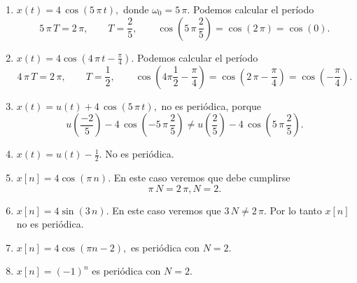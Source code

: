 \begin{enumerate}
\item  $x\left( t\right) = 4 \, \cos \left( 5 \, \pi \, t\right),$ donde $\omega_{0} = 5 \, \pi$.
Podemos calcular el período
\begin{equation}
    5 \, \pi \, T= 2 \, \pi , \qquad T=\frac{2}{5}, \qquad \cos \left( 5 \, \pi \, \frac{2}{5}\right) = 
    \cos \left( 2 \, \pi \right) = \cos \left( 0\right) .
\end{equation}

\item  $x\left( t\right) =4\cos \left( 4 \, \pi \, t-\frac{\pi }{4}\right).$ Podemos calcular el período
\begin{equation}
    4 \, \pi \, T= 2 \, \pi , \qquad T=\frac{1}{2}, \qquad \cos \left( 4\pi \frac{1}{2} - \frac{\pi}{4}\right) = 
    \cos \left( 2 \, \pi - \frac{\pi}{4}\right) = \cos \left( -\frac{\pi}{4}\right) .
\end{equation}

\item  $x\left( t\right) =u\left( t\right) +4 \, \cos \left( 5 \, \pi \, t\right),$ 
no es periódica, porque 
\begin{equation}
u\left(\frac{-2}{5}\right) - 4 \, \cos \left(-5 \, \pi \, \frac{2}{5}\right) \neq u\left(\frac{2}{5}\right) - 4 \, \cos \left(5 \, \pi \, \frac{2}{5}\right). 
\end{equation}


\item  $x\left( t\right) =u\left( t\right) -\frac{1}{2}.$ No es periódica.

\item  $x\left[ n\right] =4\cos \left( \pi \, n\right).$ En este caso veremos que debe cumplirse 
\begin{equation}
\pi \, N=2 \, \pi , N=2.
\end{equation}

\item  $x\left[ n\right] =4\sin \left( 3 \, n\right).$ En  este caso veremos que $3 \, N \neq 2 \, \pi$. Por lo tanto $x[n]$ no es periódica.

\item  $x\left[ n\right] =4\cos \left( \pi n-2\right),$ es periódica con $N = 2$.

\item  $x\left[ n\right] =\left( -1\right) ^{n}$ es periódica con $N = 2$.

\end{enumerate}

